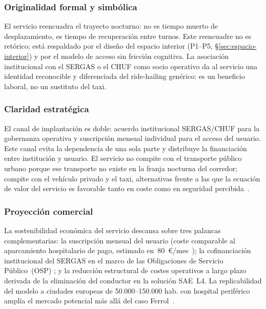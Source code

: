 \subsubsection{Originalidad formal y simbólica}

El servicio reencuadra el trayecto nocturno: no es tiempo
muerto de desplazamiento, es tiempo de recuperación entre
turnos. Este reencuadre no es retórico; está respaldado por
el diseño del espacio interior (P1--P5, §\ref{sec:espacio-interior})
y por el modelo de acceso sin fricción cognitiva. La asociación
institucional con el \acs{SERGAS} o el \acs{CHUF} como socio
operativo da al servicio una identidad reconocible y
diferenciada del ride-hailing genérico: es un beneficio laboral,
no un sustituto del taxi.

\subsubsection{Claridad estratégica}

El canal de implantación es doble: acuerdo institucional
\acs{SERGAS}/\acs{CHUF} para la gobernanza operativa y
suscripción mensual individual para el acceso del usuario.
Este canal evita la dependencia de una sola parte y distribuye
la financiación entre institución y usuario. El servicio no
compite con el transporte público urbano porque ese transporte
no existe en la franja nocturna del corredor; compite con el
vehículo privado y el taxi, alternativas frente a las que
la ecuación de valor del servicio es favorable tanto en coste
como en seguridad percibida~\parencite{PlyushetvaBoussauw2020}.

\subsubsection{Proyección comercial}

La sostenibilidad económica del servicio descansa sobre tres
palancas complementarias: la suscripción mensual del usuario
(coste comparable al aparcamiento hospitalario de pago,
estimado en~80~€/mes~\parencite{LouridoRegueira2026}); la
cofinanciación institucional del \acs{SERGAS} en el marco de
las Obligaciones de Servicio Público~(\acs{OSP})
\parencite{UITP2024}; y la reducción estructural de costes
operativos a largo plazo derivada de la eliminación del
conductor en la solución \acs{SAE}~L4. La replicabilidad del
modelo a ciudades europeas de 50.000--150.000 hab. con
hospital periférico amplía el mercado potencial más allá
del caso Ferrol~\parencite{URBACTNight2024}.


